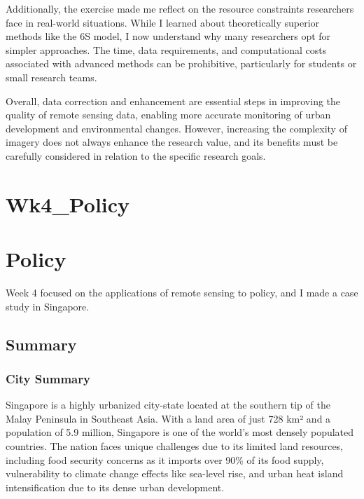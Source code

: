 \documentclass[
  letterpaper,
  DIV=11,
  numbers=noendperiod]{scrreprt}
\begin{document}
Additionally, the exercise made me reflect on the resource constraints
researchers face in real-world situations. While I learned about
theoretically superior methods like the 6S model, I now understand why
many researchers opt for simpler approaches. The time, data
requirements, and computational costs associated with advanced methods
can be prohibitive, particularly for students or small research teams.

Overall, data correction and enhancement are essential steps in
improving the quality of remote sensing data, enabling more accurate
monitoring of urban development and environmental changes. However,
increasing the complexity of imagery does not always enhance the
research value, and its benefits must be carefully considered in
relation to the specific research goals.


\chapter{Wk4\_Policy}\label{wk4_policy}


\chapter{Policy}\label{policy}

Week 4 focused on the applications of remote sensing to policy, and I
made a case study in Singapore.

\section{Summary}\label{summary-1}

\subsection{City Summary}\label{city-summary}

Singapore is a highly urbanized city-state located at the southern tip
of the Malay Peninsula in Southeast Asia. With a land area of just 728
km² and a population of 5.9 million, Singapore is one of the world's
most densely populated countries. The nation faces unique challenges due
to its limited land resources, including food security concerns as it
imports over 90\% of its food supply, vulnerability to climate change
effects like sea-level rise, and urban heat island intensification due
to its dense urban development.
\end{document}
